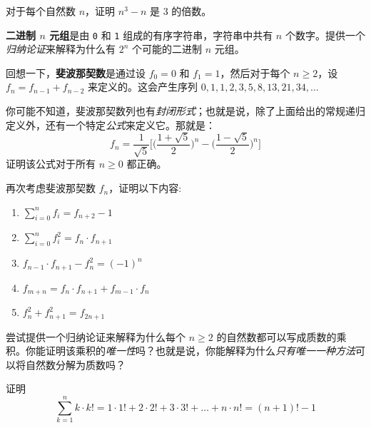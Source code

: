 \begin{exercise}
    对于每个自然数 $n$，证明 $n^3 - n$ 是 3 的倍数。
\end{exercise}

\begin{exercise}
    \textbf{二进制 $n$ 元组}是由 \verb|0| 和 \verb|1| 组成的有序字符串，字符串中共有 $n$ 个数字。提供一个\textit{归纳论证}来解释为什么有 $2^n$ 个可能的二进制 $n$ 元组。
\end{exercise}

\begin{exercise}
    回想一下，\textbf{斐波那契数}是通过设 $f_0 = 0$ 和 $f_1 = 1$，然后对于每个 $n \ge 2$，设 $f_n = f_{n-1} + f_{n-2}$ 来定义的。这会产生序列 $0, 1, 1, 2, 3, 5, 8, 13, 21, 34, \dots$

    你可能不知道，斐波那契数列也有\textit{封闭形式}；也就是说，除了上面给出的常规递归定义外，还有一个特定\textit{公式}来定义它。那就是：
    \[f_n = \frac{1}{\sqrt 5}\Bigg[\Bigg(\frac{1+\sqrt 5}{2}\Bigg)^n - \Bigg(\frac{1-\sqrt 5}{2}\Bigg)^n\Bigg]\]
    证明该公式对于所有 $n \ge 0$ 都正确。
\end{exercise}

\begin{exercise}
    再次考虑斐波那契数 $f_n$，证明以下内容:
    \begin{enumerate}
        \item $\displaystyle{\sum_{i=0}^{n}f_i = f_{n+2} - 1}$
        \item $\displaystyle{\sum_{i=0}^{n}f_i^2 = f_n \cdot f_{n+1}}$
        \item $\displaystyle{f_{n-1} \cdot f_{n+1} - f_n^2 = (-1)^n}$
        \item $\displaystyle{f_{m+n} = f_n \cdot f_{n+1} + f_{m-1} \cdot f_n}$
        \item $\displaystyle{f_n^2 + f_{n+1}^2 = f_{2n+1}}$
    \end{enumerate}
\end{exercise}

\begin{exercise}
    尝试提供一个归纳论证来解释为什么每个 $n ≥ 2$ 的自然数都可以写成质数的乘积。你能证明该乘积的\textit{唯一性}吗？也就是说，你能解释为什么\textit{只有唯一一种方法}可以将自然数分解为质数吗？
\end{exercise}

\begin{exercise}
    证明
    \[\sum_{k=1}^{n} k \cdot k! = 1 \cdot 1! + 2 \cdot 2! + 3 \cdot 3! + \dots + n \cdot n! = (n+1)!-1\]
\end{exercise}

